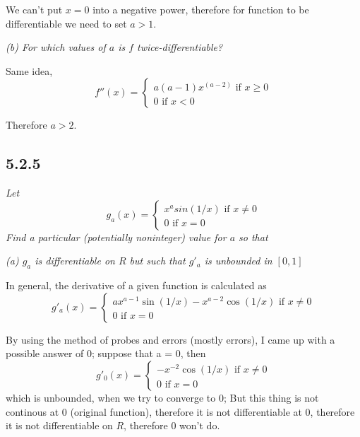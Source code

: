 \documentclass[11pt,oneside,titlepage]{book}
\begin{document}
We can't put  $x = 0$ into a negative power, therefore  for
function to be differentiable we need to set $a > 1$.

\textit{(b) For which values of $a$ is $f$ twice-differentiable?}

Same idea,
\begin{equation}
  f''(x) =
  \begin{cases}
    a(a - 1)x^(a - 2) \text{ if } x \geq 0 \\
    0 \text{ if } x < 0
  \end{cases}
\end{equation}

Therefore $a > 2$.

\subsection*{5.2.5}
\textit{Let }
\begin{equation}
  g_a(x) =
  \begin{cases}
    x^a sin(1/x) \text{ if } x \neq 0 \\
    0 \text{ if } x = 0
  \end{cases}
\end{equation}
\textit{Find a particular (potentially noninteger) value for $a$ so that}

\textit{(a) $g_a$ is differentiable on $R$ but such that $g'_a$ is unbounded
  in $[0, 1]$}

In general, the derivative of a given function is calculated as
\begin{equation}
  g'_a(x) =
  \begin{cases}
    ax^{a - 1} \sin(1/x) - x^{a - 2}\cos(1/x) \text{ if } x \neq 0 \\
    0 \text{ if } x = 0
  \end{cases}
\end{equation}

By using the method of probes and errors (mostly errors), I came up with
a possible answer of 0; suppose that a = 0, then
\begin{equation}
  g'_0(x) =
  \begin{cases}
    - x^{-2}\cos(1/x) \text{ if } x \neq 0 \\
    0 \text{ if } x = 0
  \end{cases}
\end{equation}
which is unbounded, when we try to converge to 0; But this thing is not
continous at 0 (original function), therefore it is not differentiable at
0, therefore it is not differentiable on $R$,  therefore $0$ won't do.
\end{document}
